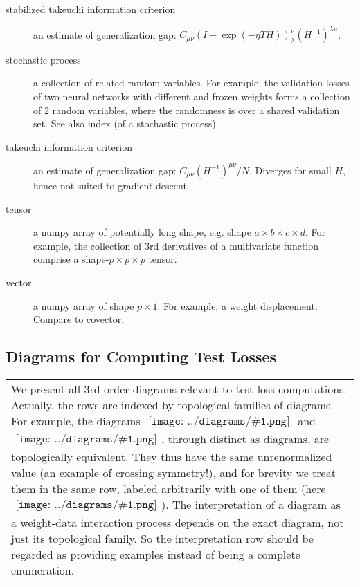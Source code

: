 \documentclass{article}
\theoremstyle{plain}
\theoremstyle{definition}
\newcommand{\wrap}[1]{\left(#1\right)}
\newcommand{\sdia}[1]{\begin{gathered}\texttt{[image: ../diagrams/\#1.png]}\end{gathered}}
\begin{document}
\begin{description}
        \item[stabilized takeuchi information criterion] an estimate of generalization gap: $C_{\mu\nu}\wrap{ I - \exp(-\eta T H) }^{\nu}_{\lambda}\wrap{H^{-1}}^{\lambda\mu}$. 
        \item[stochastic process] a collection of related random variables.  For example, the validation losses of two neural networks with different and frozen weights forms a collection of $2$ random variables, where the randomness is over a shared validation set.  See also index (of a stochastic process).
        \item[takeuchi information criterion] an estimate of generalization gap: $C_{\mu\nu}(H^{-1})^{\mu\nu}/N$.  Diverges for small $H$, hence not suited to gradient descent.
        \item[tensor] a numpy array of potentially long shape, e.g. shape $a\times b\times c\times d$.  For example, the collection of $3$rd derivatives of a multivariate function comprise a shape-$p\times p\times p$ tensor. 
        \item[vector] a numpy array of shape $p\times 1$.  For example, a weight displacement.  Compare to covector.
    \end{description}

    \clearpage
    \newpage

    \subsection{
        Diagrams for Computing Test Losses
    }

    \begin{tabular}{p{}}
        We present all $3$rd order diagrams relevant to test loss computations.
        Actually, the rows are indexed by topological families of diagrams.  For
        example, the diagrams $\sdia{(0-1-2)(01-12)}$ and
        $\sdia{(0-1-2)(02-12)}$, through distinct as diagrams, are
        topologically equivalent.  They thus have the same unrenormalized value
        (an example of crossing symmetry!), and for brevity we treat them
        in the same row, labeled arbitrarily with one of them (here
        $\sdia{(0-1-2)(02-12)}$).  The interpretation of a diagram as a
        weight-data interaction process depends on the exact diagram, not just
        its topological family.  So the interpretation row should be regarded
        as providing examples instead of being a complete enumeration.
    \end{tabular}    
\end{document}
